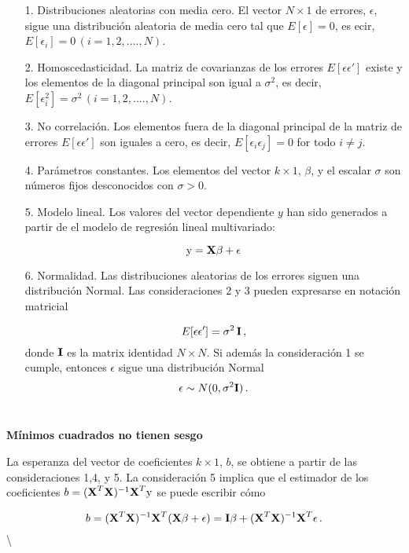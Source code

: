\documentclass[
]{agujournal2019}
\begin{document}
\begin{itemize}
\item[1.]Distribuciones aleatorias con media cero. El vector
$N\times1$ de errores, $\epsilon$, sigue una distribución aleatoria de
media cero tal que $E[\epsilon]=0$, es ecir, 
$E[\epsilon_i]=0\,(i=1,2,....,N)$.

\item[2.]Homoscedasticidad. La matriz de covarianzas de los errores
$E[\epsilon \epsilon']$ existe y los elementos de la diagonal
principal son igual a $\sigma^2$, es decir,
$E[\epsilon^2_i]=\sigma^2\,(i=1,2,....,N)$.
\item[3.]No correlación. Los elementos fuera de la diagonal principal
de la matriz de errores $E[\epsilon \epsilon']$ son iguales a cero,
es decir, $E[\epsilon_i\epsilon_j]=0$ for todo $i\neq j$.
\item[4.]Parámetros constantes. Los elementos del vector $k\times1$,
$\beta$, y el escalar $\sigma$ son números fijos desconocidos con
$\sigma>0$.
\item[5.]Modelo lineal. Los valores del vector dependiente $y$ han sido
generados a partir de el modelo de regresión lineal multivariado:

$${\rm y}={\textbf X}\beta + \epsilon$$

\item[6.]Normalidad. Las distribuciones aleatorias de los errores siguen
una distribución Normal. Las consideraciones 2 y 3 pueden expresarse en
notación matricial

$$E[\epsilon \epsilon']=\sigma^2\,{\textbf I}\,,$$
donde ${\textbf I}$ es la matrix identidad $N\times N$. Si además la
consideración 1 se cumple, entonces $\epsilon$ sigue una distribución Normal
$$\epsilon\sim N(0,\sigma^2{\textbf I})\,.$$
\\
\end{itemize}

\vspace{0.5cm}

\textbf{Mínimos cuadrados no tienen sesgo}

La esperanza del vector de coeficientes \(k\times 1\), \(b\), se obtiene
a partir de las consideraciones 1,4, y 5. La consideración 5 implica que
el estimador de los coeficientes
\(b=({\textbf X}^T{\textbf X})^{-1}{\textbf X}^T {\rm y}\) se puede
escribir cómo

\[b=({\textbf X}^T{\textbf X})^{-1}{\textbf X}^T({\textbf X} \beta + \epsilon)={\textbf I}\beta +
    ({\textbf X}^T{\textbf X})^{-1}{\textbf X}^T \epsilon\,.\]
\textbackslash{}
\end{document}
